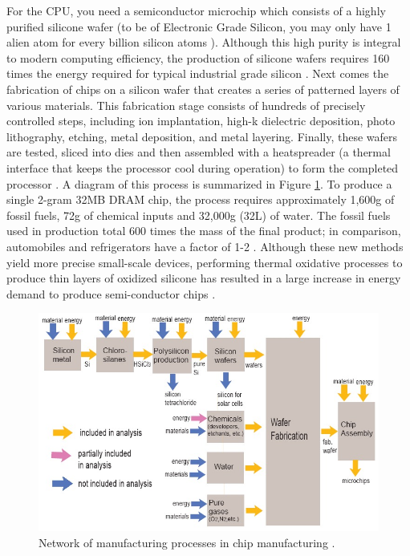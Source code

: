 \documentclass{article}
\begin{document}
For the CPU, you need a semiconductor microchip which consists of a highly purified silicone wafer (to be of Electronic Grade Silicon, you may only have 1 alien atom for every billion silicon atoms \cite{intel2011makingachip}). Although this high purity is integral to modern computing efficiency, the production of silicone wafers requires 160 times the energy required for typical industrial grade silicon \cite{williams20021}. Next comes the fabrication of chips on a silicon wafer that creates a series of patterned layers of various materials. This fabrication stage consists of hundreds of precisely controlled steps, including ion implantation, high-k dielectric deposition, photo lithography, etching, metal deposition, and metal layering. Finally, these wafers are tested, sliced into dies and then assembled with a heatspreader (a thermal interface that keeps the processor cool during operation) to form the completed processor \cite{intel2011makingachip}. A diagram of this process is summarized in Figure \ref{production_chip}. To produce a single 2-gram 32MB DRAM chip, the process requires approximately 1,600g of fossil fuels, 72g of chemical inputs and 32,000g (32L) of water. The fossil fuels used in production total 600 times the mass of the final product; in comparison, automobiles and refrigerators have a factor of  1-2 \cite{williams20021}. Although these new methods yield more precise small-scale devices, performing thermal oxidative processes to produce thin layers of oxidized silicone has resulted in a large increase in energy demand to produce semi-conductor chips  \cite{gutowski2009thermodynamic}.

\begin{figure}[h]
    \includegraphics[width=.9 \textwidth]{./images/production_chip.jpg}
    \centering
    \caption{Network of manufacturing processes in chip manufacturing \cite{williams2004environmental}.}
    \label{production_chip}
\end{figure}
\end{document}
